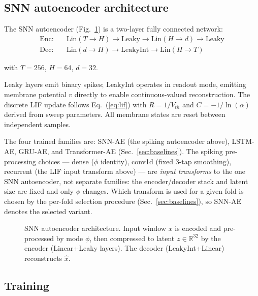 \documentclass[conference]{IEEEtran}
\begin{document}
\subsection{SNN autoencoder architecture}
\label{sec:snn-arch}

\par The SNN autoencoder (Fig.~\ref{fig:arch}) is a two-layer fully connected
network:
\begin{align*}
\text{Enc:}&\quad
  \mathrm{Lin}(T{\to}H)\to\mathrm{Leaky}\to
  \mathrm{Lin}(H{\to}d)\to\mathrm{Leaky}\\
\text{Dec:}&\quad
  \mathrm{Lin}(d{\to}H)\to\mathrm{LeakyInt}\to
  \mathrm{Lin}(H{\to}T)
\end{align*}
\par with $T=256$, $H=64$, $d=32$.
\par Leaky layers emit binary spikes; LeakyInt operates in readout mode, emitting membrane potential $v$ directly to enable continuous-valued reconstruction. The discrete LIF update follows Eq.~(\ref{eq:lif}) with $R = 1/V_{th}$ and $C = -1/\ln(\alpha)$ derived from sweep parameters. All membrane states are reset between independent samples.

\par The four trained families are: SNN-AE (the spiking autoencoder above),
LSTM-AE, GRU-AE, and Transformer-AE (Sec.~\ref{sec:baselines}). The spiking
pre-processing choices --- dense ($\phi$ identity), conv1d (fixed 3-tap
smoothing), recurrent (the LIF input transform above) --- are \emph{input
transforms} to the one SNN autoencoder, not separate families: the
encoder/decoder stack and latent size are fixed and only $\phi$ changes. Which
transform is used for a given fold is chosen by the per-fold selection procedure
(Sec.~\ref{sec:baselines}), so SNN-AE denotes the selected variant.

\begin{figure}[!t]
  \centering
  
  \caption{SNN autoencoder architecture.  Input window $x$ is encoded and
  pre-processed by mode $\phi$, then compressed to latent $z \in \mathbb{R}^{32}$
  by the encoder (Linear+Leaky layers).  The decoder (LeakyInt+Linear)
  reconstructs $\hat{x}$.}
  \label{fig:arch}
\end{figure}

\subsection{Training}
\end{document}
